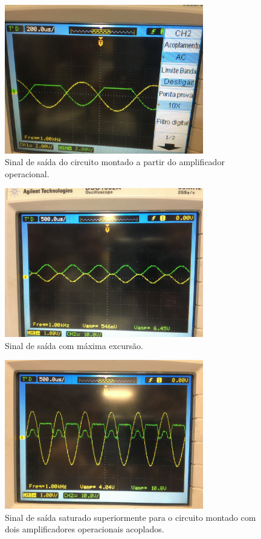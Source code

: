     \begin{figure}[h!]
        \centering
        \includegraphics[height=6.5cm]{imgSource/oscilloscope/foto2.jpg}
        \caption{Sinal de saída do circuito montado a partir do amplificador operacional.}
        \label{fig:foto3}
    \end{figure}

    \begin{figure}[h!]
        \centering
        \includegraphics[height=6.5cm]{imgSource/oscilloscope/foto5.jpg}
        \caption{Sinal de saída com máxima excursão.}
        \label{fig:foto7}
    \end{figure}

    \begin{figure}[h!]
        \centering
        \includegraphics[height=6.5cm]{imgSource/oscilloscope/foto6.jpg}
        \caption{Sinal de saída saturado superiormente para o circuito montado com dois amplificadores operacionais acoplados.}
        \label{fig:foto6}
    \end{figure}

